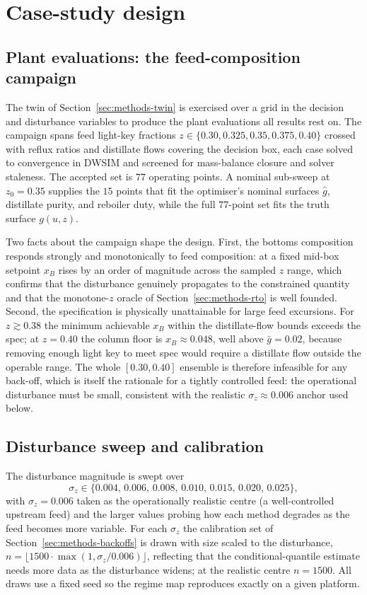 \documentclass[review,times]{elsarticle}
\begin{document}
\section{Case-study design}
\label{sec:case}

\subsection{Plant evaluations: the feed-composition campaign}

The twin of Section~\ref{sec:methods-twin} is exercised over a grid in the decision and
disturbance variables to produce the plant evaluations all results rest on. The campaign
spans feed light-key fractions $z\in\{0.30,0.325,0.35,0.375,0.40\}$ crossed with reflux
ratios and distillate flows covering the decision box, each case solved to convergence in
DWSIM and screened for mass-balance closure and solver staleness. The accepted set is $77$
operating points. A nominal sub-sweep at $z_0=0.35$ supplies the $15$ points that fit the
optimiser's nominal surfaces $\hat g$, distillate purity, and reboiler duty, while the full
$77$-point set fits the truth surface $g(u,z)$.

Two facts about the campaign shape the design. First, the bottoms composition responds
strongly and monotonically to feed composition: at a fixed mid-box setpoint $x_B$ rises by an
order of magnitude across the sampled $z$ range, which confirms that the disturbance genuinely
propagates to the constrained quantity and that the monotone-$z$ oracle of
Section~\ref{sec:methods-rto} is well founded. Second, the specification is physically
unattainable for large feed excursions. For $z\gtrsim0.38$ the minimum achievable $x_B$ within
the distillate-flow bounds exceeds the spec; at $z=0.40$ the column floor is $x_B\approx0.048$,
well above $\bar g=0.02$, because removing enough light key to meet spec would require a
distillate flow outside the operable range. The whole $[0.30,0.40]$ ensemble is therefore
infeasible for any back-off, which is itself the rationale for a tightly controlled feed: the
operational disturbance must be small, consistent with the realistic $\sigma_z\approx0.006$
anchor used below.

\subsection{Disturbance sweep and calibration}

The disturbance magnitude is swept over
\[
\sigma_z\in\{0.004,\,0.006,\,0.008,\,0.010,\,0.015,\,0.020,\,0.025\},
\]
with $\sigma_z=0.006$ taken as the
operationally realistic centre (a well-controlled upstream feed) and the larger values probing
how each method degrades as the feed becomes more variable. For each $\sigma_z$ the calibration
set of Section~\ref{sec:methods-backoffs} is drawn with size scaled to the disturbance,
$n=\lfloor 1500\cdot\max(1,\sigma_z/0.006)\rfloor$, reflecting that the conditional-quantile
estimate needs more data as the disturbance widens; at the realistic centre $n=1500$. All
draws use a fixed seed so the regime map reproduces exactly on a given platform.
\end{document}
